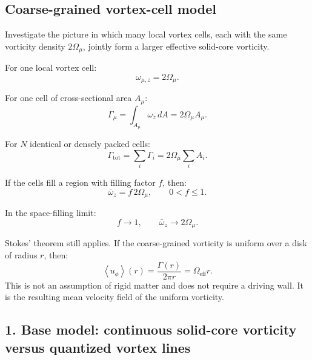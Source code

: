 \documentclass[11pt]{article}
\begin{document}
        
        \subsection{Coarse-grained vortex-cell model}
            
            Investigate the picture in which many local vortex cells, each with the same vorticity density \(2\Omega_{\mu}\), jointly form a larger effective solid-core vorticity.
            
            For one local vortex cell:
            \[
                \omega_{\mu,z}=2\Omega_{\mu}.
            \]
            
            For one cell of cross-sectional area \(A_{\mu}\):
            \[
                \Gamma_{\mu}
                =
                \int_{A_{\mu}}\omega_z\,dA
                =
                2\Omega_{\mu}A_{\mu}.
            \]
            
            For \(N\) identical or densely packed cells:
            \[
                \Gamma_{\mathrm{tot}}
                =
                \sum_i\Gamma_i
                =
                2\Omega_{\mu}\sum_i A_i.
            \]
            
            If the cells fill a region with filling factor \(f\), then:
            \[
                \bar{\omega}_z
                =
                f\,2\Omega_{\mu},
                \qquad
                0<f\leq1.
            \]
            
            In the space-filling limit:
            \[
                f\rightarrow1,
                \qquad
                \bar{\omega}_z\rightarrow2\Omega_{\mu}.
            \]
            
            Stokes' theorem still applies. If the coarse-grained vorticity is uniform over a disk of radius \(r\), then:
            \[
                \left\langle u_{\phi}\right\rangle(r)
                =
                \frac{\Gamma(r)}{2\pi r}
                =
                \Omega_{\mathrm{eff}}r.
            \]
            This is not an assumption of rigid matter and does not require a driving wall. It is the resulting mean velocity field of the uniform vorticity.
        
        \subsection{1. Base model: continuous solid-core vorticity versus quantized vortex lines}
            
\end{document}
